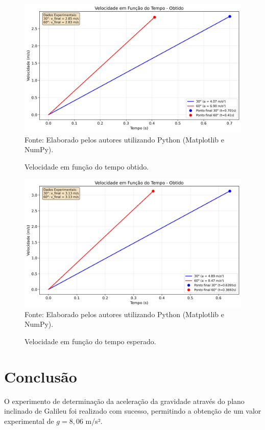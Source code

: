 \documentclass[a4paper, 12pt]{article}
\begin{document}
\begin{figure}[!htpb]
	\centering
	\caption{Velocidade em função do tempo obtido.}
	\includegraphics[scale=0.3]{./pictures/velocidade_tempo_obtido.png}
	\label{fig:velocidade_tempo_obtido}
	Fonte: Elaborado pelos autores utilizando Python (Matplotlib e NumPy).
\end{figure}

\begin{figure}[!htpb]
	\centering
	\caption{Velocidade em função do tempo esperado.}
	\includegraphics[scale=0.3]{./pictures/velocidade_tempo_esperado.png}
	\label{fig:velocidade_tempo_esperado}
	Fonte: Elaborado pelos autores utilizando Python (Matplotlib e NumPy).
\end{figure}
\section{Conclusão}
O experimento de determinação da aceleração da gravidade através do plano inclinado de Galileu foi realizado com sucesso, permitindo a obtenção de um valor experimental de $g = 8,06$ m/s².
\end{document}

